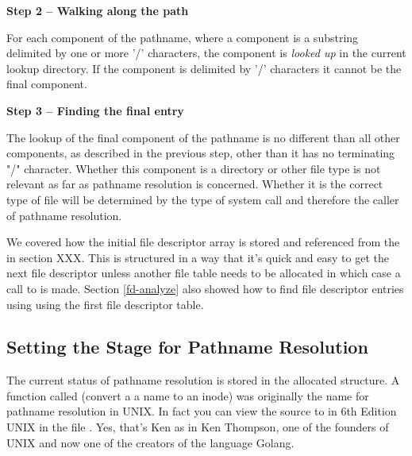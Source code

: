 \vspace{0.25cm}
\noindent
\textbf{Step 2 --  Walking along the path}

\vspace{0.25cm}
\noindent
For each component of the pathname, where a component is a substring delimited by one or more '/' characters, the component is \textit{looked up} in the current lookup directory. If the component is delimited by '/' characters it cannot be the final component.

\vspace{0.25cm}
\noindent
\textbf{Step 3 -- Finding the final entry}

\vspace{0.25cm}
\noindent
The lookup of the final component of the pathname is no different than all other components, as described in the previous step, other than it has no terminating "/" character. Whether this component is a directory or other file type is not relevant as far as pathname resolution is concerned. Whether it is the correct type of file will be determined by the type of system call and therefore the caller of pathname resolution.

\vspace{0.25cm}
We covered how the initial file descriptor array is stored and referenced from the  in section XXX. This is structured in a way that it's quick and easy to get the next file descriptor unless another file table needs to be allocated in which case a call to  is made. Section \ref{fd-analyze} also showed how to find file descriptor entries using  using the first file descriptor table.


\subsection{Setting the Stage for Pathname Resolution}\label{pathname-set}

The current status of pathname resolution is stored in the allocated  structure. A function called  (convert a a name to an inode) was originally the name for pathname resolution in UNIX. In fact you can view the source to  in 6th Edition UNIX in the file . Yes, that's Ken as in Ken Thompson, one of the founders of UNIX and now one of the creators of the language Golang. 

